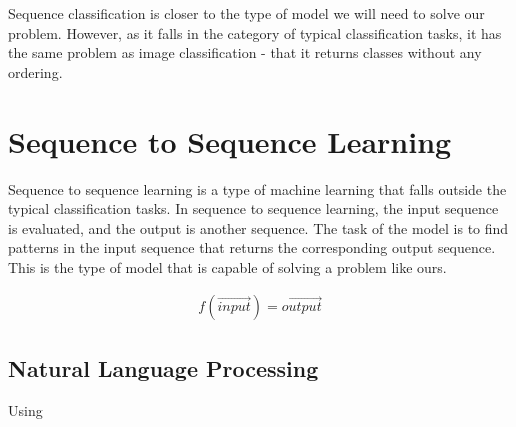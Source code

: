 Sequence classification is closer to the type of model we will need to solve our problem. However, as it falls in the category of typical classification tasks, it has the same problem as image classification - that it returns classes without any ordering.


\section{Sequence to Sequence Learning}
Sequence to sequence learning is a type of machine learning that falls outside the typical classification tasks. In sequence to sequence learning, the input sequence is evaluated, and the output is another sequence. The task of the model is to find patterns in the input sequence that returns the corresponding output sequence. This is the type of model that is capable of solving a problem like ours.

\begin{equation}
    \begin{aligned}
        f(\vec{input}) = \vec{output}
    \end{aligned}
\end{equation}

\subsection{Natural Language Processing}
Using 